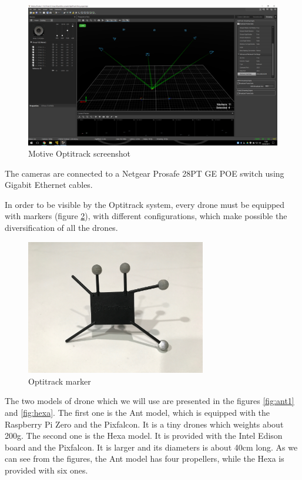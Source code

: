 \begin{figure}[h]
\centering
\includegraphics[width=1.0\textwidth]{chapters/chapter-03/figures/cameras_square.png}
\caption{Motive Optitrack screenshot}
\label{fig:camera_square}
\end{figure}

The cameras are connected to a Netgear Prosafe 28PT GE POE \cite{netgear} switch using
Gigabit Ethernet cables.

In order to be visible by the Optitrack system, every drone must be equipped with
markers (figure \ref{fig:marker}), with different configurations,
which make possible the diversification of all the drones. %

\begin{figure}[h]
\centering
\includegraphics[width=0.7\textwidth]{chapters/chapter-03/figures/marker.jpg}
\caption{Optitrack marker}
\label{fig:marker}
\end{figure}

The two models of drone which we will use are presented in the figures \ref{fig:ant1}
and \ref{fig:hexa}. The first one is the Ant model, which is equipped with the Raspberry
Pi Zero and the Pixfalcon. It is a tiny drones which weights about 200g.
The second one is the Hexa model. It is provided with the Intel Edison board and
the Pixfalcon. It is larger and its diameters is about 40cm long.
As we can see from the figures, the Ant model has four propellers, while the Hexa
is provided with six ones.

